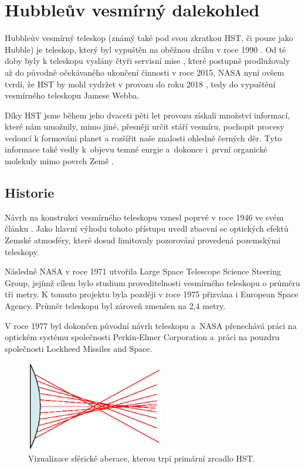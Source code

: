 \documentclass[a4paper,11pt]{article}
\begin{document}
\section{Hubbleův vesmírný dalekohled}
Hubbleův vesmírný teleskop (známý také pod svou zkratkou HST, či pouze jako Hubble) je teleskop, který byl vypuštěn na oběžnou dráhu v roce 1990 \cite{nasaHubbleChronology}. Od té doby byly k teleskopu vyslány čtyři servisní mise \cite{hubbleSiteServicingMissions}, které postupně prodlužovaly až do původně očekávaného ukončení činnosti v roce 2015, NASA nyní ovšem tvrdí, že HST by mohl vydržet v provozu do roku 2018 \cite{hubbleUntil2018}, tedy do vypuštění vesmírného teleskopu Jamese Webba.

Díky HST jsme během jeho dvaceti pěti let provozu získali množství informací, které nám umožnily, mimo jiné, přesněji určit stáří vesmíru, pochopit procesy vedoucí k formování planet a rozšířit naše znalosti ohledně černých děr. Tyto informace také vedly k~objevu temné enrgie a~dokonce i~první organické molekuly mimo povrch Země \cite{nasaHubbleAccomplishments}.

\subsection{Historie}

Návrh na konstrukci vesmírného teleskopu vznesl poprvé v roce 1946 ve svém článku \cite{LymanSpitzer1990131}. Jako hlavní výhodu tohoto přístupu uvedl zbaevní se optických efektů Zemské atmosféry, které dosud limitovaly pozorování provedená pozemskými teleskopy.

Následně NASA v roce 1971 utvořila Large Space Telescope Science Steering Group, jejímž cílem bylo studium proveditelnosti vesmírného teleskopu o průměru tři metry. K tomuto projektu byla později v roce 1975 přizvána i European Space Agency. Průměr teleskopu byl zároveň zmenšen na 2,4 metry. 

V roce 1977 byl dokončen původní návrh teleskopu a~NASA přenechává práci na optickém systému společnosti Perkin-Elmer Corporation a~práci na pouzdru společnosti Lockheed Missiles and Space.


\begin{figure}[h]
	\begin{center}
		\includegraphics[width=6cm]{Spherical_aberration_2.eps}
		\caption{Vizualizace sférické aberace, kterou trpí primární zrcadlo HST.}
		\label{Spherical_aberration_2}
	\end{center}
\end{figure}
\end{document}
